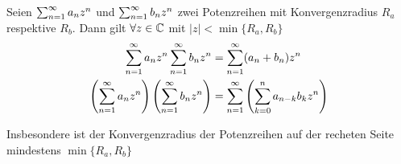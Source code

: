 \begin{thm}
	Seien $\sum_{n=1}^{\infty} a_n z^n$ und $\sum_{n=1}^{\infty} b_n z^n$ zwei Potenzreihen mit Konvergenzradius $R_a$ respektive $R_b$. Dann gilt $\forall z \in \mathbb{C}$ mit $|z| < \min \{R_a, R_b \}$
	\begin{equation}
		\begin{aligned}
			\sum_{n=1}^{\infty} a_n z^n  \sum_{n=1}^{\infty} b_n z^n  &= \sum_{n=1}^{\infty} (a_n + b_n) z^n \\
			\left( \sum_{n=1}^{\infty} a_n z^n \right) \left( \sum_{n=1}^{\infty} b_n z^n \right)
			 & = \sum_{n=1}^{\infty} \left( \sum_{k=0}^{n} a_{n-k} b_k z^n \right) 
		\end{aligned}
	\end{equation}
	
	Insbesondere ist der Konvergenzradius der Potenzreihen auf der recheten Seite mindestens $\min \{ R_a, R_b \}$
\end{thm}